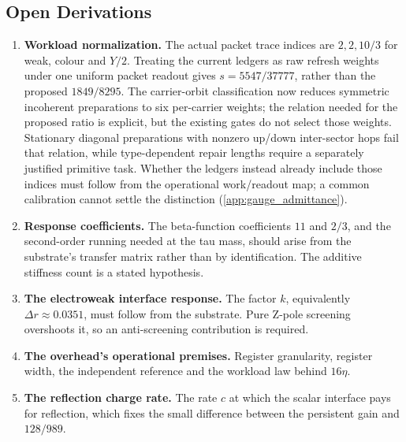 \subsection{Open Derivations}

\begin{enumerate}
    \item \textbf{Workload normalization.} The actual packet trace indices are $2,2,10/3$ for weak, colour and $Y/2$. Treating the current ledgers as raw refresh weights under one uniform packet readout gives $s=5547/37777$, rather than the proposed $1849/8295$. The carrier-orbit classification now reduces symmetric incoherent preparations to six per-carrier weights; the relation needed for the proposed ratio is explicit, but the existing gates do not select those weights. Stationary diagonal preparations with nonzero up/down inter-sector hops fail that relation, while type-dependent repair lengths require a separately justified primitive task. Whether the ledgers instead already include those indices must follow from the operational work/readout map; a common calibration cannot settle the distinction (\cref{app:gauge_admittance}).
    \item \textbf{Response coefficients.} The beta-function coefficients $11$ and $2/3$, and the second-order running needed at the tau mass, should arise from the substrate's transfer matrix rather than by identification. The additive stiffness count is a stated hypothesis.
    \item \textbf{The electroweak interface response.} The factor $k$, equivalently $\Delta r\approx0.0351$, must follow from the substrate. Pure Z-pole screening overshoots it, so an anti-screening contribution is required.
    \item \textbf{The overhead's operational premises.} Register granularity, register width, the independent reference and the workload law behind $16\eta$.
    \item \textbf{The reflection charge rate.} The rate $c$ at which the scalar interface pays for reflection, which fixes the small difference between the persistent gain and $128/989$.
\end{enumerate}
